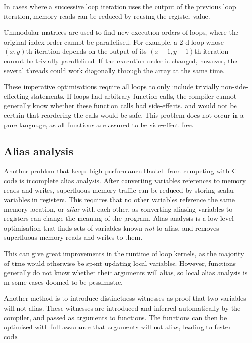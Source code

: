 In cases where a successive loop iteration uses the output of the previous loop iteration, memory reads can be reduced by reusing the register value\cite{wang2013loop}.

Unimodular matrices are used to find new execution orders of loops, where the original index order cannot be parallelised\cite{banerjee1993loop}.
For example, a 2-d loop whose $(x,y)$th iteration depends on the output of its $(x-1,y-1)$th iteration cannot be trivially parallelised.
If the execution order is changed, however, the several threads could work diagonally through the array at the same time.

These imperative optimisations require all loops to only include trivially non-side-effecting statements.
If loops had arbitrary function calls, the compiler cannot generally know whether these function calls had side-effects,
and would not be certain that reordering the calls would be safe.
This problem does not occur in a pure language, as all functions are assured to be side-effect free.


\subsection{Alias analysis}

Another problem that keeps high-performance Haskell from competing with C code is incomplete alias analysis.
After converting variables references to memory reads and writes, superfluous memory traffic can be reduced by storing scalar variables in registers.
This requires that no other variables reference the same memory location, or \emph{alias} with each other,
as converting aliasing variables to registers can change the meaning of the program.
Alias analysis is a low-level optimisation that finds sets of variables known \emph{not} to alias, and removes superfluous memory reads and writes to them.

This can give great improvements in the runtime of loop kernels, as the majority of time would otherwise be spent updating local variables\cite{clifton2012optimisations}.
However, functions generally do not know whether their arguments will alias, so local alias analysis is in some cases doomed to be pessimistic.

Another method is to introduce distinctness witnesses\cite{ma2012type} as proof that two variables will not alias.
These witnesses are introduced and inferred automatically by the compiler, and passed as arguments to functions.
The functions can then be optimised with full assurance that arguments will not alias, leading to faster code.

